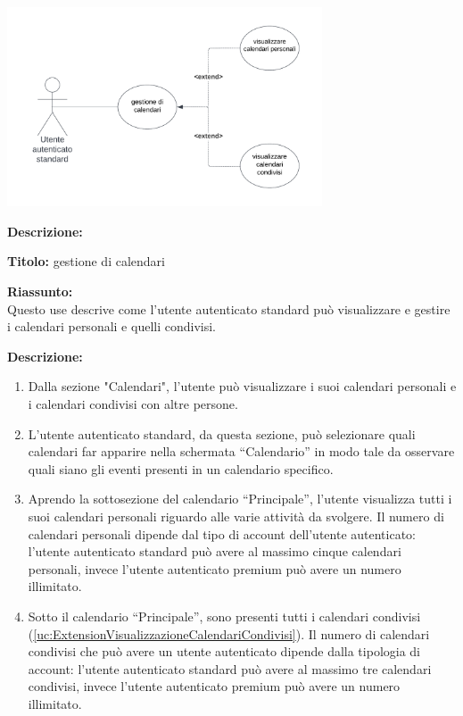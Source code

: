 \begin{listaPersonale}[UC]{}
    \newpage


    \begin{center}
        \includegraphics[width=0.7\textwidth]{img/Diagrammi/UseCases/CondivisioneCalendario.png}
    \end{center}

    \textbf{Descrizione:}

    \textbf{Titolo:} gestione di calendari

    \textbf{Riassunto:} \\
    Questo use descrive come l'utente autenticato standard può visualizzare e gestire i calendari personali e quelli condivisi.

    \textbf{Descrizione:}
    \begin{enumerate}
        \item Dalla sezione "Calendari", l'utente può visualizzare i suoi calendari personali e i calendari condivisi con altre persone.
        \item L'utente autenticato standard, da questa sezione, può selezionare quali calendari far apparire nella schermata “Calendario” in modo tale da osservare quali siano gli eventi presenti in un calendario specifico.
        \item Aprendo la sottosezione del calendario “Principale”, l'utente visualizza tutti i suoi calendari personali riguardo alle varie attività da svolgere. Il numero di calendari personali dipende dal tipo di account dell'utente autenticato: l'utente autenticato standard può avere al massimo cinque calendari personali, invece l'utente autenticato premium può avere un numero illimitato.
        \item Sotto il calendario “Principale”, sono presenti tutti i calendari condivisi (\ref{uc:ExtensionVisualizzazioneCalendariCondivisi}). Il numero di calendari condivisi che può avere un utente autenticato dipende dalla tipologia di account: l'utente autenticato standard può avere al massimo tre calendari condivisi, invece l'utente autenticato premium può avere un numero illimitato.
    \end{enumerate}



\end{listaPersonale}
